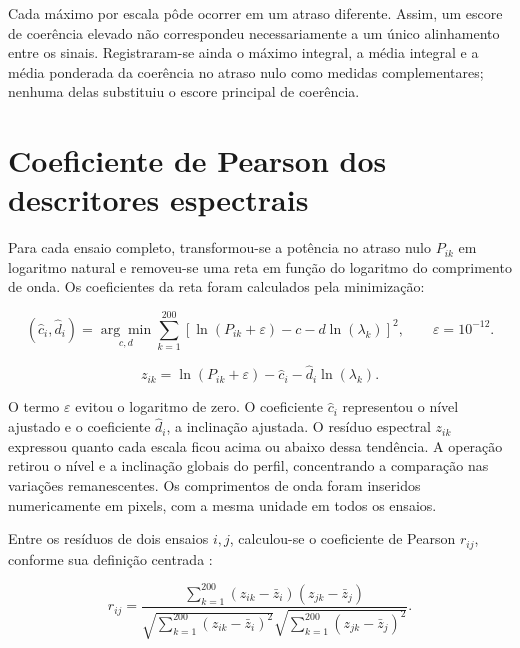 Cada máximo por escala pôde ocorrer em um atraso diferente. Assim, um escore de
coerência elevado não correspondeu necessariamente a um único alinhamento entre os
sinais. Registraram-se ainda o máximo integral, a média integral e a média
ponderada da coerência no atraso nulo como medidas complementares; nenhuma delas
substituiu o escore principal de coerência.

\section{Coeficiente de Pearson dos descritores espectrais}\label{sec:met-pearson}

Para cada ensaio completo, transformou-se a potência no atraso nulo $P_{ik}$ em
logaritmo natural e removeu-se uma reta em função do logaritmo do comprimento de
onda. Os coeficientes da reta foram calculados pela minimização:

\begin{equation}\label{eq:met-ajuste}
  (\widehat c_i,\widehat d_i)=\underset{c,d}{\arg\min}
  \sum_{k=1}^{200}\left[\ln(P_{ik}+\varepsilon)-c-d\ln(\lambda_k)\right]^2,
  \qquad \varepsilon=10^{-12}.
\end{equation}

\begin{equation}\label{eq:met-residuos}
  z_{ik}=\ln(P_{ik}+\varepsilon)-\widehat c_i-\widehat d_i\ln(\lambda_k).
\end{equation}

\noindent
O termo $\varepsilon$ evitou o logaritmo de zero. O coeficiente $\widehat c_i$
representou o nível ajustado e o coeficiente $\widehat d_i$, a inclinação ajustada.
O resíduo espectral $z_{ik}$ expressou quanto cada escala ficou acima ou abaixo
dessa tendência. A operação retirou o nível e a inclinação globais do perfil,
concentrando a comparação nas variações remanescentes. Os comprimentos de onda
foram inseridos numericamente em pixels, com a mesma unidade em todos os ensaios.

Entre os resíduos de dois ensaios $i,j$, calculou-se o coeficiente de Pearson
$r_{ij}$, conforme sua definição centrada \cite{cunningham2020}:

\begin{equation}\label{eq:met-pearson}
  r_{ij}=\frac{\sum_{k=1}^{200}(z_{ik}-\bar z_i)(z_{jk}-\bar z_j)}
   {\sqrt{\sum_{k=1}^{200}(z_{ik}-\bar z_i)^2}
    \sqrt{\sum_{k=1}^{200}(z_{jk}-\bar z_j)^2}}.
\end{equation}

